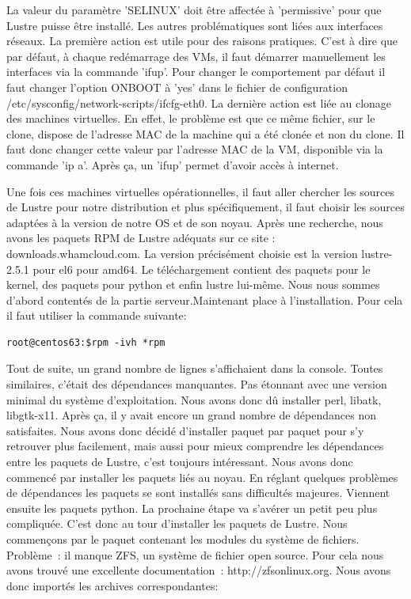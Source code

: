 \documentclass[12pt]{article}
\begin{document}
La valeur du paramètre 'SELINUX' doit être affectée à 'permissive' pour que Lustre puisse être installé. Les autres problématiques sont liées aux interfaces réseaux. La première action est utile pour des raisons pratiques. C'est à dire que par défaut, à chaque redémarrage des VMs, il faut démarrer manuellement les interfaces via la commande 'ifup'. Pour changer le comportement par défaut il faut changer l'option ONBOOT à  'yes' dans le fichier de configuration /etc/sysconfig/network-scripts/ifcfg-eth0. La dernière action est liée au clonage des machines virtuelles. En effet, le problème est que ce même fichier, sur le clone, dispose de l'adresse MAC de la machine qui a été clonée et non du clone. Il faut donc changer cette valeur par l'adresse MAC de la VM, disponible via la commande 'ip a'. Après ça, un 'ifup' permet d'avoir accès à internet.

Une fois ces machines virtuelles opérationnelles, il faut aller chercher les sources de Lustre pour notre distribution et plus spécifiquement, il faut choisir les sources adaptées à la version de notre OS et de son noyau. Après une recherche, nous avons les paquets RPM de Lustre adéquats sur ce site : downloads.whamcloud.com. La version précisément choisie est la version lustre-2.5.1 pour el6 pour amd64. Le téléchargement contient des paquets pour le kernel, des paquets pour python et enfin lustre lui-même. Nous nous sommes d'abord contentés de la partie serveur.Maintenant place à l'installation. Pour cela il faut utiliser la commande suivante:

\begin{verbatim}
root@centos63:$rpm -ivh *rpm
\end{verbatim}

Tout de suite, un grand nombre de lignes s'affichaient dans la console. Toutes similaires, c'était des dépendances manquantes. Pas étonnant avec une version minimal du système d'exploitation. Nous avons donc dû installer perl, libatk, libgtk-x11. Après ça, il y avait encore un grand nombre de dépendances non satisfaites. Nous avons donc décidé d'installer paquet par paquet pour s'y retrouver plus facilement, mais aussi pour mieux comprendre les dépendances entre les paquets de Lustre, c'est toujours intéressant. Nous avons donc commencé par installer les paquets liés au noyau. En réglant quelques problèmes de dépendances les paquets se sont installés sans difficultés majeures. Viennent ensuite les paquets python. La prochaine étape va s'avérer un petit peu plus compliquée. C'est donc au tour d'installer les paquets de Lustre. Nous commençons par le paquet contenant les modules du système de fichiers. Problème : il manque ZFS, un système de fichier open source. Pour cela nous avons trouvé une excellente documentation : http://zfsonlinux.org. Nous avons donc importés les archives correspondantes:
\end{document}
